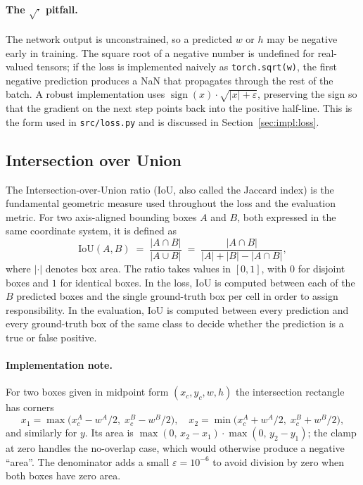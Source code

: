 \paragraph{The $\sqrt{\cdot}$ pitfall.} The network output is unconstrained,
so a predicted $w$ or $h$ may be negative early in training. The square root
of a negative number is undefined for real-valued tensors; if the loss is
implemented naively as \texttt{torch.sqrt(w)}, the first negative prediction
produces a NaN that propagates through the rest of the batch. A robust
implementation uses $\operatorname{sign}(x) \cdot \sqrt{|x| + \varepsilon}$,
preserving the sign so that the gradient on the next step points back into
the positive half-line. This is the form used in \texttt{src/loss.py} and is
discussed in Section~\ref{sec:impl:loss}.

\subsection{Intersection over Union}
\label{sec:theory:iou}

The Intersection-over-Union ratio (IoU, also called the Jaccard index) is the
fundamental geometric measure used throughout the loss and the evaluation
metric. For two axis-aligned bounding boxes $A$ and $B$, both expressed in
the same coordinate system, it is defined as
\[
  \mathrm{IoU}(A, B) \;=\; \frac{|A \cap B|}{|A \cup B|}
                     \;=\; \frac{|A \cap B|}{|A| + |B| - |A \cap B|},
\]
where $|\cdot|$ denotes box area. The ratio takes values in $[0, 1]$, with
$0$ for disjoint boxes and $1$ for identical boxes. In the loss, IoU is
computed between each of the $B$ predicted boxes and the single ground-truth
box per cell in order to assign responsibility. In the evaluation, IoU is
computed between every prediction and every ground-truth box of the same
class to decide whether the prediction is a true or false positive.

\paragraph{Implementation note.} For two boxes given in midpoint form
$(x_c, y_c, w, h)$ the intersection rectangle has corners
\[
  x_1 = \max\!\bigl(x_c^{A} - w^{A}/2,\;x_c^{B} - w^{B}/2\bigr), \quad
  x_2 = \min\!\bigl(x_c^{A} + w^{A}/2,\;x_c^{B} + w^{B}/2\bigr),
\]
and similarly for $y$. Its area is
$\max(0,\,x_2-x_1)\cdot\max(0,\,y_2-y_1)$; the clamp at zero handles the
no-overlap case, which would otherwise produce a negative ``area''. The
denominator adds a small $\varepsilon = 10^{-6}$ to avoid division by zero
when both boxes have zero area.

